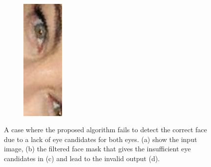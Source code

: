 \begin{figure}[H]
\begin{subfigure}{.25\textwidth}
  \caption{}
\end{subfigure}%
\begin{subfigure}{.25\textwidth}
  \centering
  \includegraphics[width=0.23\textwidth]{img/fd3/fail3_output.png}
  \caption{}
\end{subfigure}%

\caption{A case where the proposed algorithm fails to detect the correct face due to a lack of eye candidates for both eyes. (a) show the input image, (b) the filtered face mask that gives the insufficient eye candidates in (c) and lead to the invalid output (d).}
\label{fig:fail3}
\end{figure}






